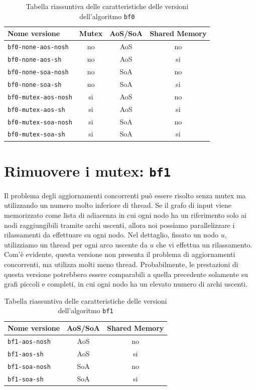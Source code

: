 \documentclass[12pt,a4paper,oneside]{book}
\begin{document}
	\begin{table}[!ht]
		\centering
		\begin{tabular}{|l|c|c|c|}
			\hline
			\textbf{Nome versione} & \textbf{Mutex} & \textbf{AoS/SoA} & \textbf{Shared Memory} \\ \hline
			\texttt{bf0-none-aos-nosh}  & no & AoS & no \\ \hline
			\texttt{bf0-none-aos-sh}    & no & AoS & si \\ \hline
			\texttt{bf0-none-soa-nosh}  & no & SoA & no \\ \hline
			\texttt{bf0-none-soa-sh}    & no & SoA & si \\ \hline
			\texttt{bf0-mutex-aos-nosh} & si & AoS & no \\ \hline
			\texttt{bf0-mutex-aos-sh}   & si & AoS & si \\ \hline
			\texttt{bf0-mutex-soa-nosh} & si & SoA & no \\ \hline
			\texttt{bf0-mutex-soa-sh}   & si & SoA & si \\ \hline
		\end{tabular}
		\label{tab:riassunto_bf0}
		\caption{Tabella riassuntiva delle caratteristiche delle versioni dell'algoritmo \texttt{bf0}}
	\end{table}
	
	\section{Rimuovere i mutex: \texttt{bf1}}
	\label{section:intro-bf1}
	Il problema degli aggiornamenti concorrenti può essere risolto senza mutex ma utilizzando un numero molto inferiore di thread. Se il grafo di input viene memorizzato come lista di adiacenza in cui ogni nodo ha un riferimento solo ai nodi raggiungibili tramite archi uscenti, allora noi possiamo parallelizzare i rilassamenti da effettuare su ogni nodo. Nel dettaglio, fissato un nodo $u$, utilizziamo un thread per ogni arco uscente da $u$ che vi effettua un rilassamento. Com'è evidente, questa versione non presenta il problema di aggiornamenti concorrenti, ma utilizza molti meno thread. Probabilmente, le prestazioni di questa versione potrebbero essere comparabili a quella precedente solamente su grafi piccoli e completi, in cui ogni nodo ha un elevato numero di archi uscenti.
	
	\begin{table}[!ht]
		\centering
		\begin{tabular}{|l|c|c|}
			\hline
			\textbf{Nome versione} & \textbf{AoS/SoA} & \textbf{Shared Memory} \\ \hline
			\texttt{bf1-aos-nosh}  & AoS & no \\ \hline
			\texttt{bf1-aos-sh}    & AoS & si \\ \hline
			\texttt{bf1-soa-nosh}  & SoA & no \\ \hline
			\texttt{bf1-soa-sh}    & SoA & si \\ \hline
		\end{tabular}
		\label{tab:riassunto_bf1}
		\caption{Tabella riassuntiva delle caratteristiche delle versioni dell'algoritmo \texttt{bf1}}
	\end{table}
	
\end{document}
